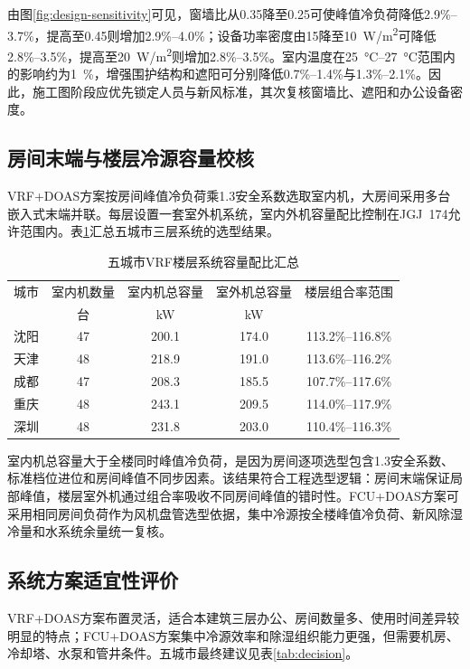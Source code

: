 由图\ref{fig:design-sensitivity}可见，窗墙比从0.35降至0.25可使峰值冷负荷降低2.9\%--3.7\%，提高至0.45则增加2.9\%--4.0\%；设备功率密度由15降至\SI{10}{W/m^2}可降低2.8\%--3.5\%，提高至\SI{20}{W/m^2}则增加2.8\%--3.5\%。室内温度在\SI{25}{\degreeCelsius}--\SI{27}{\degreeCelsius}范围内的影响约为\SI{1}{\percent}，增强围护结构和遮阳可分别降低0.7\%--1.4\%与1.3\%--2.1\%。因此，施工图阶段应优先锁定人员与新风标准，其次复核窗墙比、遮阳和办公设备密度。

\subsection{房间末端与楼层冷源容量校核}

VRF+DOAS方案按房间峰值冷负荷乘1.3安全系数选取室内机，大房间采用多台嵌入式末端并联。每层设置一套室外机系统，室内外机容量配比控制在JGJ~174允许范围内。表\ref{tab:vrf-floor-comparison}汇总五城市三层系统的选型结果。

\begin{table}[!htbp]
\centering
\caption{五城市VRF楼层系统容量配比汇总}
\label{tab:vrf-floor-comparison}
\begin{tabular}{@{}lcccc@{}}
\toprule
城市 & 室内机数量 & 室内机总容量 & 室外机总容量 & 楼层组合率范围 \\
 & 台 & \si{kW} & \si{kW} & \\
\midrule
沈阳 & 47 & 200.1 & 174.0 & 113.2\%--116.8\% \\
天津 & 48 & 218.9 & 191.0 & 113.6\%--116.2\% \\
成都 & 47 & 208.3 & 185.5 & 107.7\%--117.6\% \\
重庆 & 48 & 243.1 & 209.5 & 114.0\%--117.9\% \\
深圳 & 48 & 231.8 & 203.0 & 110.4\%--116.3\% \\
\bottomrule
\end{tabular}
\end{table}

室内机总容量大于全楼同时峰值冷负荷，是因为房间逐项选型包含1.3安全系数、标准档位进位和房间峰值不同步因素。该结果符合工程选型逻辑：房间末端保证局部峰值，楼层室外机通过组合率吸收不同房间峰值的错时性。FCU+DOAS方案可采用相同房间负荷作为风机盘管选型依据，集中冷源按全楼峰值冷负荷、新风除湿冷量和水系统余量统一复核。

\subsection{系统方案适宜性评价}

VRF+DOAS方案布置灵活，适合本建筑三层办公、房间数量多、使用时间差异较明显的特点；FCU+DOAS方案集中冷源效率和除湿组织能力更强，但需要机房、冷却塔、水泵和管井条件。五城市最终建议见表\ref{tab:decision}。

